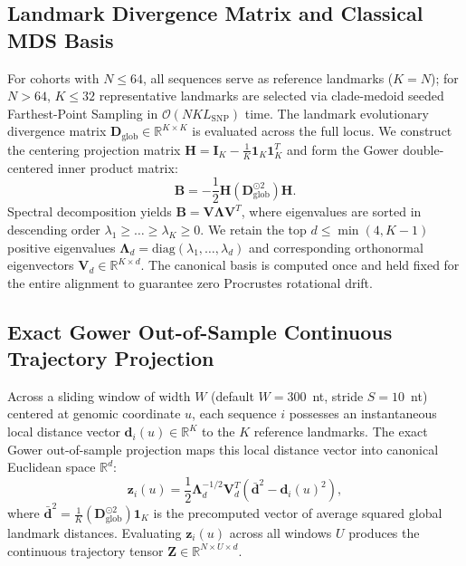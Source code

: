 \subsection{Landmark Divergence Matrix and Classical MDS Basis}
For cohorts with $N \le 64$, all sequences serve as reference landmarks ($K = N$); for $N > 64$, $K \le 32$ representative landmarks are selected via clade-medoid seeded Farthest-Point Sampling in $\mathcal{O}(N K L_{\mathrm{SNP}})$ time.
The landmark evolutionary divergence matrix $\mathbf{D}_{\mathrm{glob}} \in \mathbb{R}^{K \times K}$ is evaluated across the full locus.
We construct the centering projection matrix $\mathbf{H} = \mathbf{I}_K - \frac{1}{K}\mathbf{1}_K\mathbf{1}_K^T$ and form the Gower double-centered inner product matrix:
\begin{equation}
\mathbf{B} = -\frac{1}{2}\mathbf{H}(\mathbf{D}_{\mathrm{glob}}^{\odot 2})\mathbf{H}.
\end{equation}
Spectral decomposition yields $\mathbf{B} = \mathbf{V}\mathbf{\Lambda}\mathbf{V}^T$, where eigenvalues are sorted in descending order $\lambda_1 \ge \dots \ge \lambda_K \ge 0$.
We retain the top $d \le \min(4, K-1)$ positive eigenvalues $\mathbf{\Lambda}_d = \mathrm{diag}(\lambda_1, \dots, \lambda_d)$ and corresponding orthonormal eigenvectors $\mathbf{V}_d \in \mathbb{R}^{K \times d}$.
The canonical basis is computed once and held fixed for the entire alignment to guarantee zero Procrustes rotational drift.

\subsection{Exact Gower Out-of-Sample Continuous Trajectory Projection}
Across a sliding window of width $W$ (default $W = 300$~nt, stride $S = 10$~nt) centered at genomic coordinate $u$, each sequence $i$ possesses an instantaneous local distance vector $\mathbf{d}_i(u) \in \mathbb{R}^K$ to the $K$ reference landmarks.
The exact Gower out-of-sample projection maps this local distance vector into canonical Euclidean space $\mathbb{R}^d$:
\begin{equation}
\mathbf{z}_i(u) = \frac{1}{2} \mathbf{\Lambda}_d^{-1/2} \mathbf{V}_d^T \left(\bar{\mathbf{d}}^2 - \mathbf{d}_i(u)^2\right),
\end{equation}
where $\bar{\mathbf{d}}^2 = \frac{1}{K}(\mathbf{D}_{\mathrm{glob}}^{\odot 2})\mathbf{1}_K$ is the precomputed vector of average squared global landmark distances.
Evaluating $\mathbf{z}_i(u)$ across all windows $U$ produces the continuous trajectory tensor $\mathbf{Z} \in \mathbb{R}^{N \times U \times d}$.

